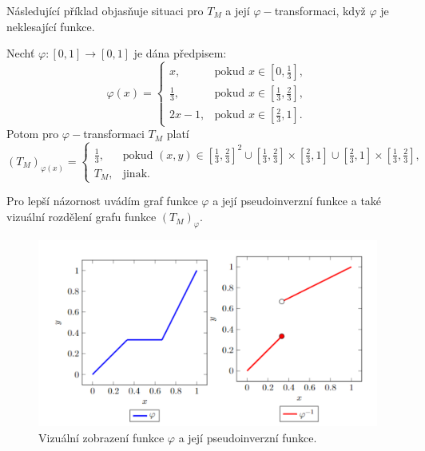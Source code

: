   
  N\'asleduj\'ic\'i p\v r\'iklad objas\v nuje situaci pro $T_M$ a jej\'i $\varphi-$transformaci, kdy\v z $\varphi$ je neklesaj\'ic\'i funkce. 
\begin{example}
\label{sub: fi}
Nech\v t $\varphi:[0,1] \to [0,1]$ je d\'ana p\v redpisem:    
 $$\varphi(x) = \begin{cases} x, & \mbox {pokud } x \in [0,\frac{1}{3}],
    \\ \frac{1}{3}, & \mbox {pokud } x \in [\frac{1}{3}, \frac{2}{3}],\\
    2x - 1, & \mbox {pokud } x \in [\frac{2}{3}, 1].
    \end{cases}$$
Potom pro $\varphi-$transformaci $T_M$ plat\'i
$$(T_M)_{\varphi(x)} = \begin{cases} \frac{1}{3}, & \mbox {pokud } (x, y) \in [\frac{1}{3},\frac{2}{3}]^2 \cup [\frac{1}{3}, \frac{2}{3}] \times [\frac{2}{3}, 1] \cup [\frac{2}{3}, 1] \times [\frac{1}{3}, \frac{2}{3}],\\
    T_M, & \mbox {jinak.}
    \end{cases}$$
\end{example}
Pro lep\v s\'i n\'azornost uv\'ad\'im graf  funkce $\varphi$ a jej\'i pseudoinverzn\'i funkce a tak\'e vizu\'aln\'i rozd\v elen\'i grafu funkce $\left(T_M\right)_\varphi.$\\

   
\begin{figure}[H]
\caption{ Vizu\' aln\' i zobrazení funkce $\varphi$ a jej\'i pseudoinverzn\'i funkce.}
                \hspace{-1cm}
                \includegraphics[scale=0.60]{template-fig/phi_transform.pdf}
                \centering
            \end{figure}

